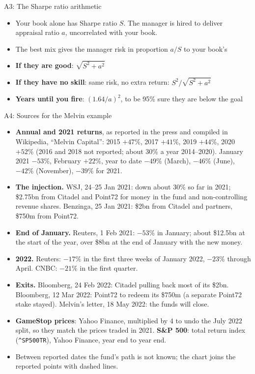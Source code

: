 \documentclass[aspectratio=169,10pt]{beamer}
\begin{document}
\begin{frame}[label=appendix_sharpe]{A3: The Sharpe ratio arithmetic}
\begin{itemize}
\item Your book alone has Sharpe ratio $S$. The manager is hired to deliver appraisal ratio $a$, uncorrelated with your book.
\vskip 10pt
\item The best mix gives the manager risk in proportion $a / S$ to your book's
\vskip 10pt
\item \textbf{If they are good}: \quad $\sqrt{S^2 + a^2}$
\vskip 10pt
\item \textbf{If they have no skill}: same risk, no extra return: \quad $S^2 \big/ \sqrt{S^2 + a^2}$
\vskip 10pt
\item \textbf{Years until you fire}: $(1.64 / a)^2$, to be 95\% sure they are below the goal
\end{itemize}
\vskip 4pt
\hfill \hyperlink{costs}{}
\end{frame}

\begin{frame}[label=melvinsources]{A4: Sources for the Melvin example}
\footnotesize
\begin{itemize}
\item \textbf{Annual and 2021 returns}, as reported in the press and compiled in Wikipedia, ``Melvin Capital'': 2015 $+47\%$, 2017 $+41\%$, 2019 $+44\%$, 2020 $+52\%$ (2016 and 2018 not reported; about 30\% a year 2014--2020). January 2021 $-53\%$, February $+22\%$, year to date $-49\%$ (March), $-46\%$ (June), $-42\%$ (November), $-39\%$ for 2021.
\item \textbf{The injection.} WSJ, 24--25 Jan 2021: down about 30\% so far in 2021; \$2.75bn from Citadel and Point72 for money in the fund and non-controlling revenue shares. Benzinga, 25 Jan 2021: \$2bn from Citadel and partners, \$750m from Point72.
\item \textbf{End of January.} Reuters, 1 Feb 2021: $-53\%$ in January; about \$12.5bn at the start of the year, over \$8bn at the end of January with the new money.
\item \textbf{2022.} Reuters: $-17\%$ in the first three weeks of January 2022, $-23\%$ through April. CNBC: $-21\%$ in the first quarter.
\item \textbf{Exits.} Bloomberg, 24 Feb 2022: Citadel pulling back most of its \$2bn. Bloomberg, 12 Mar 2022: Point72 to redeem its \$750m (a separate Point72 stake stayed). Melvin's letter, 18 May 2022: the funds will close.
\item \textbf{GameStop prices}: Yahoo Finance, multiplied by 4 to undo the July 2022 split, so they match the prices traded in 2021. \textbf{S\&P 500}: total return index (\texttt{\^{}SP500TR}), Yahoo Finance, year end to year end.
\item Between reported dates the fund's path is not known; the chart joins the reported points with dashed lines.
\end{itemize}
\hfill \hyperlink{melvinodds}{}
\end{frame}
\end{document}
